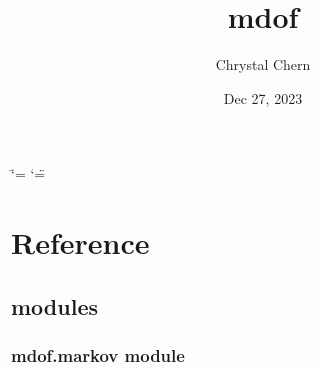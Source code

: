 \documentclass[letterpaper,10pt,english]{sphinxmanual}
\title{mdof}
\date{Dec 27, 2023}
\author{Chrystal Chern}
\begin{document}
\ifdefined\shorthandoff
  \ifnum\catcode`\=\string=\active\shorthandoff{=}\fi
  \ifnum\catcode`\"=\active{}\fi
\fi

\pagestyle{empty}
\sphinxmaketitle
\pagestyle{plain}
\sphinxtableofcontents
\pagestyle{normal}
\label{\detokenize{index::doc}}


\sphinxstepscope


\chapter{Reference}
\label{\detokenize{library/index:reference}}\label{\detokenize{library/index::doc}}

\section{modules}
\label{\detokenize{library/index:modules}}
\sphinxstepscope


\subsection{mdof.markov module}
\label{\detokenize{library/mdof.markov:module-mdof.markov}}\label{\detokenize{library/mdof.markov:mdof-markov-module}}\label{\detokenize{library/mdof.markov::doc}}
\end{document}
